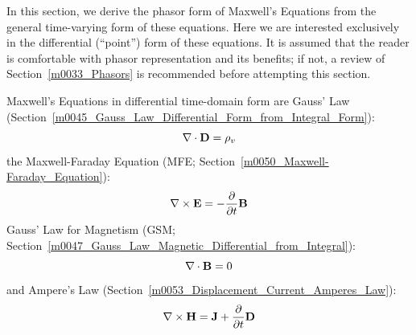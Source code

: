 

\label{m0042_Phasor_Form_of_Maxwells_Equations_Differential} %

In this section, we derive the phasor 
form of Maxwell's Equations from the general time-varying form of these equations.
Here we are interested exclusively in the differential (``point'') form of these equations. 
It is assumed that the reader is comfortable with phasor representation and its benefits; if not, a review of Section~\ref{m0033_Phasors} is recommended before attempting this section.

Maxwell's Equations in differential time-domain form are Gauss' Law (Section~\ref{m0045_Gauss_Law_Differential_Form_from_Integral_Form}):
%
\begin{equation}
\nabla\cdot{\bf D}=\rho_v
\label{m0042_eGL}
\end{equation}
%
the Maxwell-Faraday Equation (MFE; Section~\ref{m0050_Maxwell-Faraday_Equation}):
%
\begin{equation}
\nabla\times{\bf E}=-\frac{\partial}{\partial t}{\bf B}
\label{m0042_eMFE}
\end{equation}
%
Gauss' Law for Magnetism (GSM; Section~\ref{m0047_Gauss_Law_Magnetic_Differential_from_Integral}):
%
\begin{equation}
\nabla\cdot{\bf B}=0
\end{equation}
%
and Ampere's Law (Section~\ref{m0053_Displacement_Current_Amperes_Law}):
%
\begin{equation}
\nabla\times{\bf H}={\bf J} + \frac{\partial}{\partial t}{\bf D}
\end{equation}

